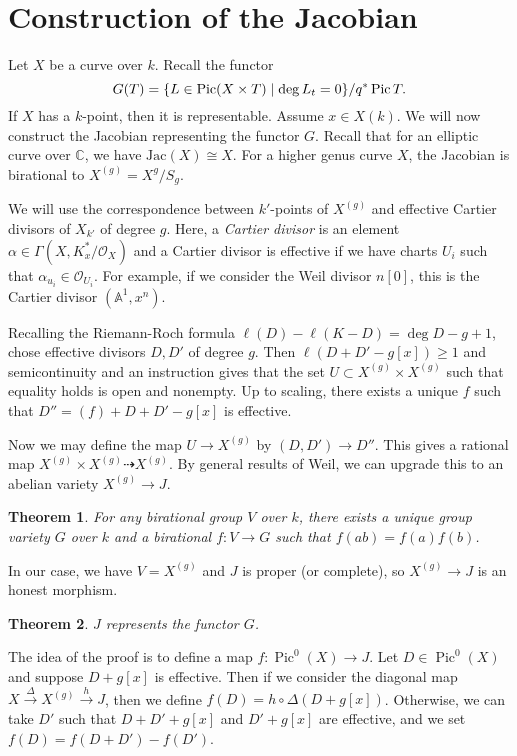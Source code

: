 \documentclass[leqno, openany]{memoir}
\newtheorem{thm}{Theorem}[section]
\theoremstyle{definition}
\theoremstyle{remark}
\theoremstyle{plain}
\theoremstyle{definition}
\theoremstyle{remark}
\newcommand{\A}{\mathbb{A}}
\newcommand{\C}{\mathbb{C}}
\newcommand{\mc}[1]{\mathcal{#1}}
\newcommand{\mr}[1]{\mathrm{#1}}
\DeclareMathOperator{\Pic}{Pic}
\begin{document}
\section{Construction of the Jacobian}%
\label{sec:construction_of_the_jacobian}

Let $X$ be a curve over $k$. Recall the functor
\[ G(T) = \qty{L \in \Pic(X \times T) \mid \deg L_t = 0} / q^* \Pic T. \]
If $X$ has a $k$-point, then it is representable. Assume $x \in X(k)$. We will now construct the Jacobian representing the functor $G$. Recall that for an elliptic curve over $\C$, we have $\mr{Jac}(X) \cong X$. For a higher genus curve $X$, the Jacobian is birational to $X^{(g)} = X^g / S_g$.

We will use the correspondence between $k'$-points of $X^{(g)}$ and effective Cartier divisors of $X_{k'}$ of degree $g$. Here, a \textit{Cartier divisor} is an element $\alpha \in \Gamma(X, K_x^* / \mc{O}_X)$ and a Cartier divisor is effective if we have charts $U_i$ such that $\alpha_{u_i} \in \mc{O}_{U_i}$. For example, if we consider the Weil divisor $n[0]$, this is the Cartier divisor $(\A^1, x^n)$.

Recalling the Riemann-Roch formula $\ell(D) - \ell(K - D) = \deg D - g + 1$, chose effective divisors $D, D'$ of degree $g$. Then $\ell(D+D' - g[x]) \geq 1$ and semicontinuity and an instruction gives that the set $U \subset X^{(g)} \times X^{(g)}$ such that equality holds is open and nonempty. Up to scaling, there exists a unique $f$ such that $D'' = (f) + D + D' - g[x]$ is effective.

Now we may define the map $U \to X^{(g)}$ by $(D, D') \to D''$. This gives a rational map $X^{(g)} \times X^{(g)} \dashrightarrow X^{(g)}$. By general results of Weil, we can upgrade this to an abelian variety $X^{(g)} \to J$.

\begin{thm}
    For any birational group $V$ over $k$, there exists a unique group variety $G$ over $k$ and a birational $f \colon V \to G$ such that $f(ab) = f(a) f(b)$.
\end{thm}

In our case, we have $V = X^{(g)}$ and $J$ is proper (or complete), so $X^{(g)} \to J$ is an honest morphism. 

\begin{thm}
    $J$ represents the functor $G$.
\end{thm}

The idea of the proof is to define a map $f \colon \Pic^0(X) \to J$. Let $D \in \Pic^0(X)$ and suppose $D + g[x]$ is effective. Then if we consider the diagonal map $X \xrightarrow{\Delta} X^{(g)} \xrightarrow{h} J$, then we define $f(D) = h \circ \Delta (D + g[x])$. Otherwise, we can take $D'$ such that $D + D' + g[x]$ and $D' + g[x]$ are effective, and we set $f(D) = f(D + D') - f(D')$.
\end{document}
